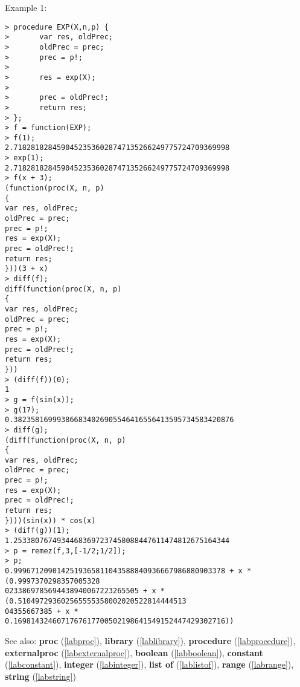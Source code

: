 \noindent Example 1: 
\begin{center}\begin{minipage}{15cm}\begin{Verbatim}[frame=single]
> procedure EXP(X,n,p) {
>       var res, oldPrec;
>       oldPrec = prec;
>       prec = p!;
>       
>       res = exp(X);
>       
>       prec = oldPrec!;
>       return res;
> };
> f = function(EXP);
> f(1);
2.71828182845904523536028747135266249775724709369998
> exp(1);
2.71828182845904523536028747135266249775724709369998
> f(x + 3);
(function(proc(X, n, p)
{
var res, oldPrec;
oldPrec = prec;
prec = p!;
res = exp(X);
prec = oldPrec!;
return res;
}))(3 + x)
> diff(f);
diff(function(proc(X, n, p)
{
var res, oldPrec;
oldPrec = prec;
prec = p!;
res = exp(X);
prec = oldPrec!;
return res;
}))
> (diff(f))(0);
1
> g = f(sin(x));
> g(17);
0.382358169993866834026905546416556413595734583420876
> diff(g);
(diff(function(proc(X, n, p)
{
var res, oldPrec;
oldPrec = prec;
prec = p!;
res = exp(X);
prec = oldPrec!;
return res;
})))(sin(x)) * cos(x)
> (diff(g))(1);
1.25338076749344683697237458088447611474812675164344
> p = remez(f,3,[-1/2;1/2]);
> p;
0.9996712090142519365811043588840936667986880903378 + x * (0.9997370298357005328
0233869785694438940067223265505 + x * (0.510497293602565555358002020522814444513
04355667385 + x * 0.1698143246071767617700502198641549152447429302716))
\end{Verbatim}
\end{minipage}\end{center}
See also: \textbf{proc} (\ref{labproc}), \textbf{library} (\ref{lablibrary}), \textbf{procedure} (\ref{labprocedure}), \textbf{externalproc} (\ref{labexternalproc}), \textbf{boolean} (\ref{labboolean}), \textbf{constant} (\ref{labconstant}), \textbf{integer} (\ref{labinteger}), \textbf{list of} (\ref{lablistof}), \textbf{range} (\ref{labrange}), \textbf{string} (\ref{labstring})
